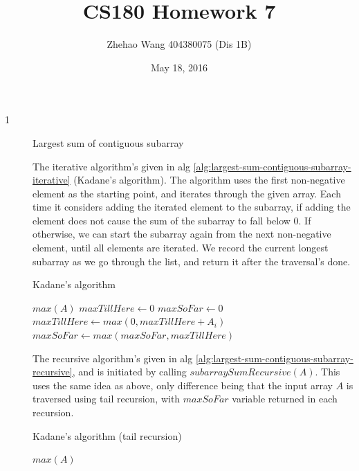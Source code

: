 \documentclass{article}
\title{CS180 Homework 7}
\author{Zhehao Wang 404380075 (Dis 1B)}
\date{May 18, 2016}
\begin{document}
\maketitle

\begin{description}

\item[1]{Largest sum of contiguous subarray}
  
  The iterative algorithm's given in alg \ref{alg:largest-sum-contiguous-subarray-iterative} (Kadane's algorithm). The algorithm uses the first non-negative element as the starting point, and iterates through the given array. Each time it considers adding the iterated element to the subarray, if adding the element does not cause the sum of the subarray to fall below 0. If otherwise, we can start the subarray again from the next non-negative element, until all elements are iterated. We record the current longest subarray as we go through the list, and return it after the traversal's done.

  \begin{algorithm}[H]
  \caption{Kadane's algorithm}
  \label{alg:largest-sum-contiguous-subarray-iterative}
    \begin{algorithmic}[1]
    
        \State \Return $max(A)$
      \EndIf
      \State $maxTillHere \gets 0$
      \State $maxSoFar \gets 0$
        \State $maxTillHere \gets max(0, maxTillHere + A_i)$
        \State $maxSoFar \gets max(maxSoFar, maxTillHere)$
      \EndFor
      \State {}
    \EndFunction

    \end{algorithmic}
  \end{algorithm}

  The recursive algorithm's given in alg \ref{alg:largest-sum-contiguous-subarray-recursive}, and is initiated by calling $subarraySumRecursive(A)$. This uses the same idea as above, only difference being that the input array $A$ is traversed using tail recursion, with $maxSoFar$ variable returned in each recursion.

  \begin{algorithm}[H]
  \caption{Kadane's algorithm (tail recursion)}
  \label{alg:largest-sum-contiguous-subarray-recursive}
    \begin{algorithmic}[1]

        \State \Return $max(A)$
      \EndIf


\end{algorithmic}
\end{algorithm}
\end{description}
\end{document}
